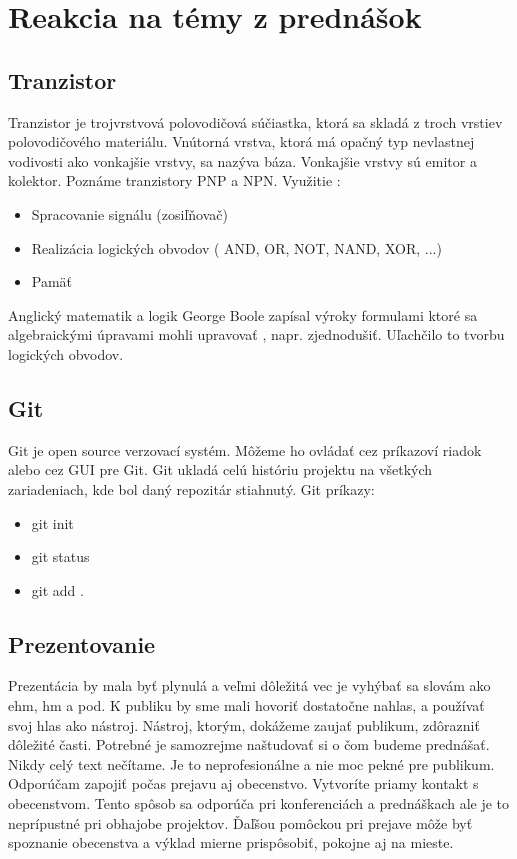\documentclass[10pt,twoside,slovak,a4paper]{article}
\begin{document}
\section{Reakcia na témy z prednášok}
\subsection{Tranzistor}
Tranzistor je trojvrstvová polovodičová súčiastka, ktorá sa skladá z troch vrstiev polovodičového materiálu. \cite{Tranzistory-Framework} Vnútorná vrstva, ktorá má opačný typ nevlastnej vodivosti ako vonkajšie vrstvy, sa nazýva báza. Vonkajšie vrstvy sú emitor a kolektor. Poznáme tranzistory PNP a NPN. 
\hfill
\break
Využitie : 
\begin{itemize}
  \item {Spracovanie signálu (zosiľňovač)}
  \item {Realizácia logických obvodov ( AND, OR, NOT, NAND, XOR, ...)}
  \item {Pamäť}
\end{itemize}
Anglický matematik a logik George Boole zapísal výroky formulami ktoré sa algebraickými úpravami mohli upravovať , napr. zjednodušiť. Uľachčilo to tvorbu logických obvodov.\cite{Tranzistory2-Framework}

\subsection{Git}
Git je open source verzovací systém. Môžeme ho ovládať cez príkazoví riadok alebo cez GUI pre Git. \cite{Git-Framework} Git ukladá celú históriu projektu na všetkých zariadeniach, kde bol daný repozitár stiahnutý.
Git príkazy: 
\begin{itemize}
  \item {git init}
  \item {git status}
  \item {git add .}

\end{itemize}

 \subsection{Prezentovanie}
 Prezentácia by mala byť plynulá a veľmi dôležitá vec je vyhýbať sa slovám ako ehm, hm a pod. K publiku by sme mali hovoriť dostatočne nahlas, a používať svoj hlas ako nástroj. Nástroj, ktorým, dokážeme zaujať publikum, zdôrazniť dôležité časti. Potrebné je samozrejme naštudovať si o čom budeme prednášať. Nikdy celý text nečítame. Je to neprofesionálne a nie moc pekné pre publikum. Odporúčam zapojiť počas prejavu aj obecenstvo. Vytvoríte priamy kontakt s obecenstvom. Tento spôsob sa odporúča pri konferenciách a prednáškach ale je to neprípustné pri obhajobe projektov. Ďaľšou pomôckou pri prejave môže byť spoznanie obecenstva a výklad mierne prispôsobiť, pokojne aj na mieste.
\end{document}
